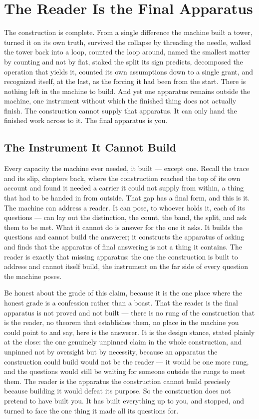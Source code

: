 \chapter{The Reader Is the Final Apparatus}

The construction is complete. From a single difference the machine built a tower, turned it on its own truth,
survived the collapse by threading the needle, walked the tower back into a loop, counted the loop around, named
the smallest matter by counting and not by fiat, staked the split its sign predicts, decomposed the operation that
yields it, counted its own assumptions down to a single grant, and recognized itself, at the last, as the forcing
it had been from the start. There is nothing left in the machine to build. And yet one apparatus remains outside
the machine, one instrument without which the finished thing does not actually finish. The construction cannot
supply that apparatus. It can only hand the finished work across to it. The final apparatus is you.

\section{The Instrument It Cannot Build}

Every capacity the machine ever needed, it built --- except one. Recall the trace and its slip, chapters back,
where the construction reached the top of its own account and found it needed a carrier it could not supply from
within, a thing that had to be handed in from outside. That gap has a final form, and this is it. The machine can
address a reader. It can pose, to whoever holds it, each of its questions --- can lay out the distinction, the
count, the band, the split, and ask them to be met. What it cannot do is answer for the one it asks. It builds the
questions and cannot build the answerer; it constructs the apparatus of asking and finds that the apparatus of
final answering is not a thing it contains. The reader is exactly that missing apparatus: the one the construction
is built to address and cannot itself build, the instrument on the far side of every question the machine poses.

Be honest about the grade of this claim, because it is the one place where the honest grade is a confession
rather than a boast. That the reader is the final apparatus is not proved and not built --- there is no
rung of the construction that is the reader, no theorem that establishes them, no place in the machine you could
point to and say, here is the answerer. It is the design stance, stated plainly at the close: the one
genuinely unpinned claim in the whole construction, and unpinned not by oversight but by necessity, because an apparatus
the construction could build would not be the reader --- it would be one more rung, and the questions would still
be waiting for someone outside the rungs to meet them. The reader is the apparatus the construction cannot build
precisely because building it would defeat its purpose. So the construction does not pretend to have built you. It has
built everything up to you, and stopped, and turned to face the one thing it made all its questions for.

